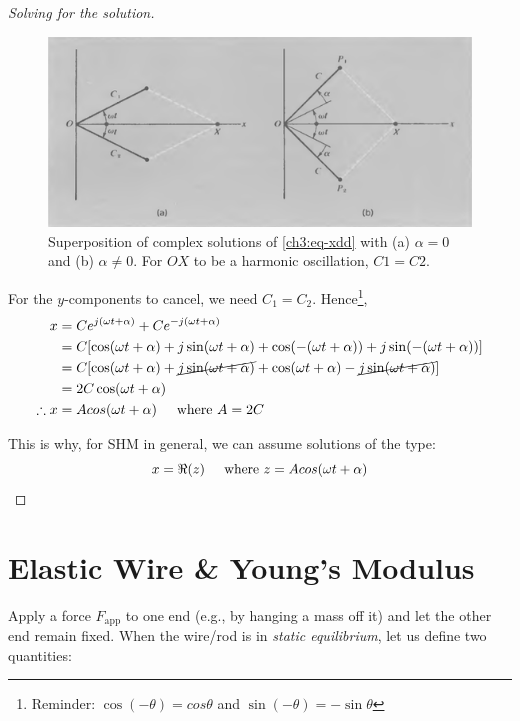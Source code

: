 \begin{proof}[Solving for the solution]
\begin{figure}[h]
	\centering
	\includegraphics[scale=0.7]{phys232/Ch3-adding-complex-solutions.png} \caption{Superposition of complex solutions of \eqref{ch3:eq-xdd} with (a) $\alpha=0$ and (b) $\alpha\neq 0$. For $OX$ to be a harmonic oscillation, $C1=C2$.}\label{ch3:fig-complex-sols}
\end{figure}


For the $y$-components to cancel, we need $C_1=C_2$. Hence\footnote{Reminder: $\cos(-\theta)=cos\theta$ and $\sin(-\theta)=-\sin\theta$},
\begin{align*}
x
&=Ce^{j(\omega t +\alpha)} + Ce^{-j(\omega t +\alpha)} \\
&=C[\cos(\omega t + \alpha) + j\sin(\omega t + \alpha) + \cos(-(\omega t + \alpha)) + j\sin(-(\omega t + \alpha))] \\
&=C[\cos(\omega t + \alpha) + \cancel{j\sin(\omega t + \alpha)} + \cos(\omega t + \alpha) - \cancel{j\sin(\omega t + \alpha)}] \\
&= 2C\cos(\omega t + \alpha) \\
\therefore
x &= Acos(\omega t + \alpha) \hspace{0.5cm}\text{where } A=2C
\end{align*}

This is why, for SHM in general, we can assume solutions of the type:
\begin{equation}
	x=\Re(z) \hspace{0.5cm}\text{where } z=Acos(\omega t + \alpha)
\end{equation}
\end{proof}


\section{Elastic Wire \& Young's Modulus} \label{ch3:sec-wire}

Apply a force $F_\text{app}$ to one end (e.g., by hanging a mass off it) and let the other end remain fixed. When the wire/rod is in \textit{static equilibrium}, let us define two quantities:

